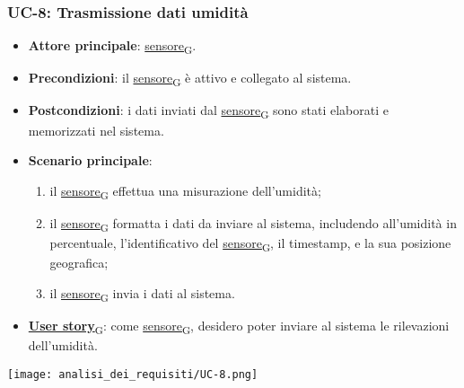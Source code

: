 \newpage
\subsubsection{UC-8: Trasmissione dati umidità}
\begin{itemize}
	\item \textbf{Attore principale}: \href{https://7last.github.io/docs/pb/documentazione-interna/glossario\#sensore}{sensore\textsubscript{G}}.
	\item \textbf{Precondizioni}: il \href{https://7last.github.io/docs/pb/documentazione-interna/glossario\#sensore}{sensore\textsubscript{G}} è attivo e collegato al sistema.
	\item \textbf{Postcondizioni}: i dati inviati dal \href{https://7last.github.io/docs/pb/documentazione-interna/glossario\#sensore}{sensore\textsubscript{G}} sono stati elaborati e memorizzati nel sistema.
	\item \textbf{Scenario principale}:
	      \begin{enumerate}
		      \item il \href{https://7last.github.io/docs/pb/documentazione-interna/glossario\#sensore}{sensore\textsubscript{G}} effettua una misurazione dell'umidità;
		      \item il \href{https://7last.github.io/docs/pb/documentazione-interna/glossario\#sensore}{sensore\textsubscript{G}} formatta i dati da inviare al sistema, includendo all'umidità in percentuale, l'identificativo del \href{https://7last.github.io/docs/pb/documentazione-interna/glossario\#sensore}{sensore\textsubscript{G}},
		            il timestamp, e la sua posizione geografica;
		      \item il \href{https://7last.github.io/docs/pb/documentazione-interna/glossario\#sensore}{sensore\textsubscript{G}} invia i dati al sistema.
	      \end{enumerate}
	\item \href{https://7last.github.io/docs/pb/documentazione-interna/glossario\#user-story}{\textbf{User story}\textsubscript{G}}: come \href{https://7last.github.io/docs/pb/documentazione-interna/glossario\#sensore}{sensore\textsubscript{G}}, desidero poter inviare al sistema le rilevazioni dell'umidità.
\end{itemize}
\begin{center}
	\texttt{[image: analisi\_dei\_requisiti/UC-8.png]}
\end{center}

